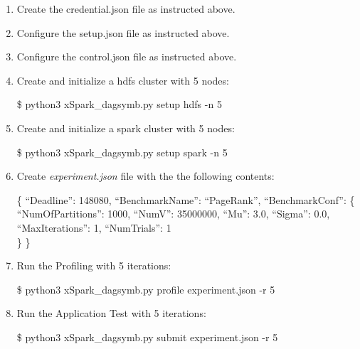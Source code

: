 \begin{enumerate}
\def\labelenumi{\arabic{enumi})}
\item
Create the credential.json file as instructed above.
\item
Configure the setup.json file as instructed above.
\item
Configure the control.json file as instructed above.
\item
Create and initialize a hdfs cluster with 5 nodes:

\$ python3 xSpark\_dagsymb.py setup hdfs -n 5
\item
Create and initialize a spark cluster with 5 nodes:

\$ python3 xSpark\_dagsymb.py setup spark -n 5
\item
Create \emph{experiment.json} file with the the following contents:

\{ ``Deadline'': 148080, ``BenchmarkName'': ``PageRank'',
``BenchmarkConf'': \{ ``NumOfPartitions'': 1000, ``NumV'': 35000000,
``Mu'': 3.0, ``Sigma'': 0.0, ``MaxIterations'': 1, ``NumTrials'': 1\\
\} \}
\item
Run the Profiling with 5 iterations:

\$ python3 xSpark\_dagsymb.py profile experiment.json -r 5
\item
Run the Application Test with 5 iterations:

\$ python3 xSpark\_dagsymb.py submit experiment.json -r 5
\end{enumerate}